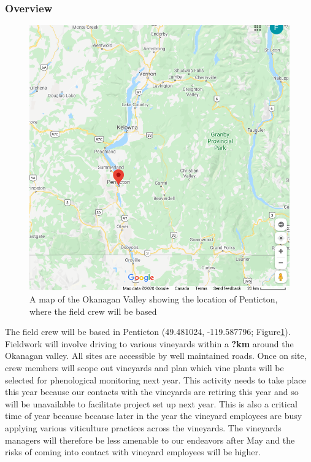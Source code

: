 \documentclass[11pt,letter]{article}
\begin{document}
\subsubsection{Overview}
\begin{figure}
  \includegraphics[width=\linewidth]{penticton.png}
  \caption{A map of the Okanagan Valley showing the location of Penticton, where the field crew will be based}
  \label{fig:OkanMap}
\end{figure}
The field crew will be based in Penticton (49.481024, -119.587796; Figure\ref{fig:OkanMap}). Fieldwork will involve driving to various vineyards within a \textbf{?km} around the Okanagan valley. All sites are accessible by well maintained roads. Once on site, crew members will scope out vineyards and plan which vine plants will be selected for phenological monitoring next year. This activity needs to take place this year because our contacts with the vineyards are retiring this year and so will be unavailable to facilitate project set up next year. This is also a critical time of year because because later in the year the vineyard employees are busy applying various viticulture practices across the vineyards. The vineyards managers will therefore be less amenable to our endeavors after May and the risks of coming into contact with vineyard employees will be higher.   
\end{document}
